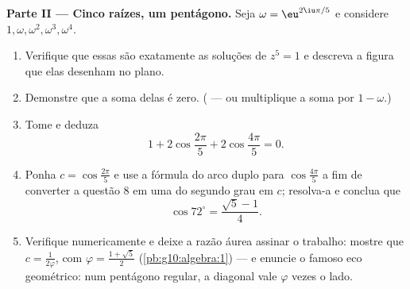 \begin{problem}
\medskip
\noindent\textbf{Parte II --- Cinco raízes, um pentágono.}
Seja $\omega = \eu^{2\iu\pi/5}$ e considere
$1, \omega, \omega^2, \omega^3, \omega^4$.
\begin{enumerate}[resume]
  \item Verifique que essas são exatamente as soluções de
        $z^5 = 1$ e descreva a figura que elas desenham no
        plano.
  \item Demonstre que a soma delas é zero. ( --- ou multiplique a soma por $1 - \omega$.)
  \item Tome  e deduza
        \[
        1 + 2\cos\frac{2\pi}{5} + 2\cos\frac{4\pi}{5} = 0 .
        \]
  \item Ponha $c = \cos\frac{2\pi}{5}$ e use a fórmula do arco
        duplo para $\cos\frac{4\pi}{5}$ a fim de converter a
        questão 8 em uma  do segundo grau em $c$;
        resolva-a e conclua que
        \[
        \cos 72^\circ = \frac{\sqrt5 - 1}{4} .
        \]
  \item Verifique numericamente e deixe a razão áurea assinar o
        trabalho: mostre que $c = \frac{1}{2\varphi}$, com
        $\varphi = \frac{1 + \sqrt5}{2}$
        (\cref{pb:g10:algebra:1}) --- e enuncie o famoso eco
        geométrico: num pentágono regular, a diagonal vale
        $\varphi$ vezes o lado.
\end{enumerate}


\end{problem}

